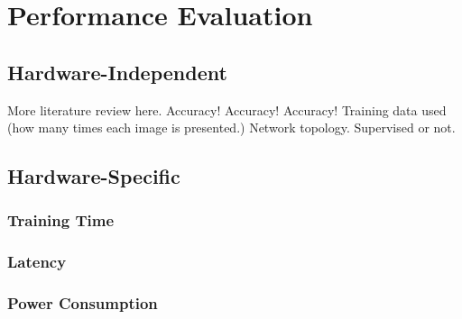 \section{Performance Evaluation}
\label{sec:eval}
\subsection{Hardware-Independent}
More literature review here. 
Accuracy! Accuracy! Accuracy!
Training data used (how many times each image is presented.)
Network topology.
Supervised or not.


\subsection{Hardware-Specific}
	\subsubsection{Training Time}
	\subsubsection{Latency}
	\subsubsection{Power Consumption}
	